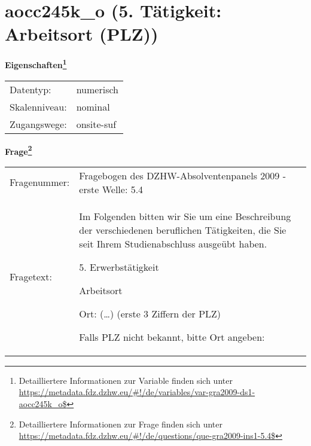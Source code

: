 
    \setcounter{footnote}{0}

    \vspace*{-1.8cm}
	\section{aocc245k\_o (5. Tätigkeit: Arbeitsort (PLZ))}
	\label{section:aocc245k_o}



    \vspace*{0.5cm}
    \noindent\textbf{Eigenschaften\footnote{Detailliertere Informationen zur Variable finden sich unter
		\url{https://metadata.fdz.dzhw.eu/\#!/de/variables/var-gra2009-ds1-aocc245k_o$}}}\\
	\begin{tabularx}{\hsize}{@{}lX}
	Datentyp: & numerisch \\
	Skalenniveau: & nominal \\
	Zugangswege: &
	  onsite-suf
 \\
    \end{tabularx}



				\vspace*{0.5cm}
                \noindent\textbf{Frage\footnote{Detailliertere Informationen zur Frage finden sich unter
		              \url{https://metadata.fdz.dzhw.eu/\#!/de/questions/que-gra2009-ins1-5.4$}}}\\
				\begin{tabularx}{\hsize}{@{}lX}
					Fragenummer: &
					  Fragebogen des DZHW-Absolventenpanels 2009 - erste Welle:
					  5.4
 \\
					Fragetext: & Im Folgenden bitten wir Sie um eine Beschreibung der verschiedenen beruflichen Tätigkeiten, die Sie seit Ihrem Studienabschluss ausgeübt haben.\par  5. Erwerbstätigkeit\par  Arbeitsort\par  Ort: (…) (erste 3 Ziffern der PLZ)\par  Falls PLZ nicht bekannt, bitte Ort angeben: \\
				\end{tabularx}






